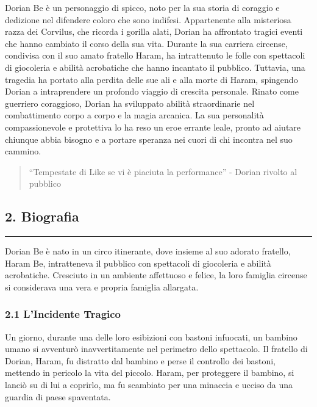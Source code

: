 Dorian Be è un personaggio di spicco, noto per la sua storia di coraggio
e dedizione nel difendere coloro che sono indifesi. Appartenente alla
misteriosa razza dei Corvilus, che ricorda i gorilla alati, Dorian ha
affrontato tragici eventi che hanno cambiato il corso della sua vita.
Durante la sua carriera circense, condivisa con il suo amato fratello
Haram, ha intrattenuto le folle con spettacoli di giocoleria e abilità
acrobatiche che hanno incantato il pubblico. Tuttavia, una tragedia ha
portato alla perdita delle sue ali e alla morte di Haram, spingendo
Dorian a intraprendere un profondo viaggio di crescita personale. Rinato
come guerriero coraggioso, Dorian ha sviluppato abilità straordinarie
nel combattimento corpo a corpo e la magia arcanica. La sua personalità
compassionevole e protettiva lo ha reso un eroe errante leale, pronto ad
aiutare chiunque abbia bisogno e a portare speranza nei cuori di chi
incontra nel suo cammino.

\begin{quote}
``Tempestate di Like se vi è piaciuta la performance'' - Dorian rivolto
al pubblico
\end{quote}

\subsection{2. Biografia}\label{biografia}

\begin{center}\rule{0.5\linewidth}{0.5pt}\end{center}

Dorian Be è nato in un circo itinerante, dove insieme al suo adorato
fratello, Haram Be, intratteneva il pubblico con spettacoli di
giocoleria e abilità acrobatiche. Cresciuto in un ambiente affettuoso e
felice, la loro famiglia circense si considerava una vera e propria
famiglia allargata.

\subsubsection{\texorpdfstring{2.1 \textbf{L'Incidente
Tragico}}{2.1 L'Incidente Tragico}}\label{lincidente-tragico}

Un giorno, durante una delle loro esibizioni con bastoni infuocati, un
bambino umano si avventurò inavvertitamente nel perimetro dello
spettacolo. Il fratello di Dorian, Haram, fu distratto dal bambino e
perse il controllo dei bastoni, mettendo in pericolo la vita del
piccolo. Haram, per proteggere il bambino, si lanciò su di lui a
coprirlo, ma fu scambiato per una minaccia e ucciso da una guardia di
paese spaventata.

